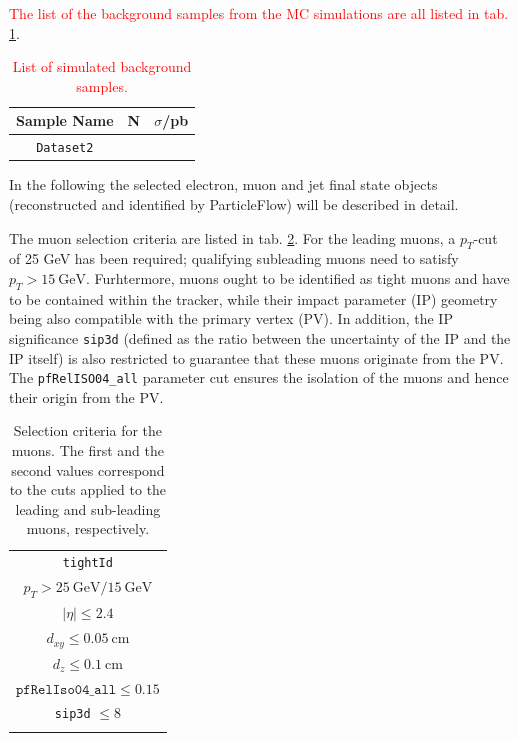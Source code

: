 \textcolor{red}{The list of the background samples from the MC simulations are all listed in tab. \ref{tab:bkg_datasets}}.

\begin{table}[h!]
	\centering
	\begin{tabular}{ccc}
		Sample Name & N & $\sigma$/pb \\
		\hline
		\texttt{Dataset2} & & \\
	\end{tabular}
	\caption{\textcolor{red}{List of simulated background samples.}}
	\label{tab:bkg_datasets}
\end{table}


In the following the selected electron, muon and jet final state objects (reconstructed and identified by ParticleFlow) will be described in detail.

The muon selection criteria are listed in tab. \ref{tab:muon_selection}. For the leading muons, a $p_T$-cut of 25 GeV has been required; qualifying subleading muons need to satisfy $p_T>\SI{15}{\giga\electronvolt}$. Furhtermore, muons ought to be identified as tight muons and have to be contained within the tracker, while their impact parameter (IP) geometry being also compatible with the primary vertex (PV). In addition, the IP significance \texttt{sip3d} (defined as the ratio between the uncertainty of the IP and the IP itself) is also restricted to guarantee that these muons originate from the PV. The \texttt{pfRelISO04\_all} parameter cut ensures the isolation of the muons and hence their origin from the PV.

\begin{table}[h!]
	\centering
	\begin{tabular}{c}
		\hline
		\texttt{tightId} \\
		$p_T > \SI{25}{\giga\electronvolt}/\SI{15}{\giga\electronvolt}$ \\
		$|\eta| \leq 2.4$ \\
		$d_{xy} \leq \SI{0.05}{\centi\meter}$ \\
		$d_z \leq \SI{0.1}{\centi\meter}$ \\
		$\texttt{pfRelIso04\_all} \leq 0.15$  \\
		\texttt{sip3d} $\leq 8$ \\
		\hline \\
	\end{tabular}
	\caption{Selection criteria for the muons. The first and the second values correspond to the cuts applied to the leading and sub-leading muons, respectively.}
	\label{tab:muon_selection}
\end{table}


